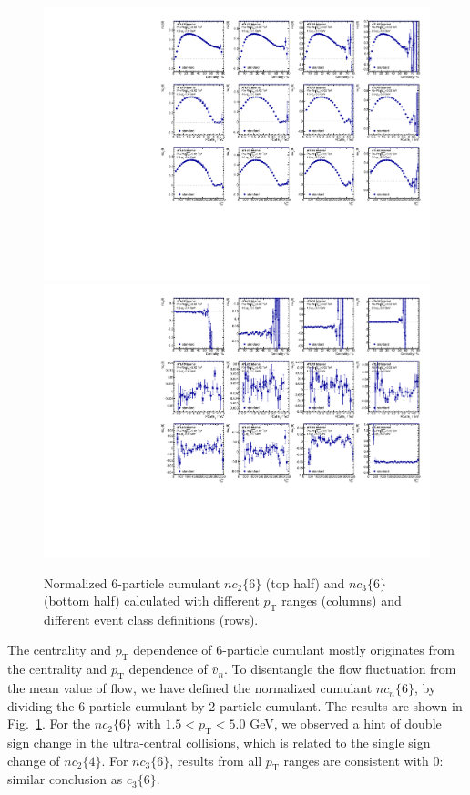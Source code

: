 \begin{figure}[H]
\centering
\includegraphics[width=.95\linewidth]{figs/sec_result/forQM/phy_nc6_Har2.pdf}
\includegraphics[width=.95\linewidth]{figs/sec_result/forQM/phy_nc6_Har3.pdf}
\caption{Normalized 6-particle cumulant $nc_2\{6\}$ (top half) and $nc_3\{6\}$ (bottom half) calculated with different $p_\text{T}$ ranges (columns) and different event class definitions (rows).}
\label{fig:result_phy_nc6_Har23}
\end{figure}
The centrality and $p_\text{T}$ dependence of 6-particle cumulant mostly originates from the centrality and $p_\text{T}$ dependence of $\bar{v}_n$. To disentangle the flow fluctuation from the mean value of flow, we have defined the normalized cumulant $nc_n\{6\}$, by dividing the 6-particle cumulant by 2-particle cumulant. The results are shown in Fig.~\ref{fig:result_phy_nc6_Har23}. For the $nc_2\{6\}$ with $1.5<p_\text{T}<5.0$ GeV, we observed a hint of double sign change in the ultra-central collisions, which is related to the single sign change of $nc_2\{4\}$. For $nc_3\{6\}$, results from all $p_\text{T}$ ranges are consistent with 0: similar conclusion as $c_3\{6\}$.

